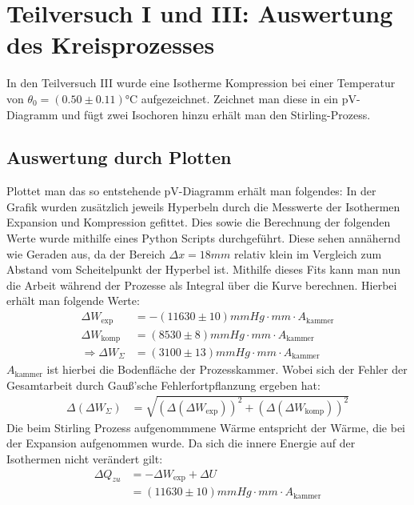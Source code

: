 \documentclass{report}
\begin{document}
\newpage
\section{Teilversuch I und III: Auswertung des Kreisprozesses}
In den Teilversuch III wurde eine Isotherme Kompression bei einer Temperatur von $\theta_0 = (0.50 \pm 0.11) \si{\degreeCelsius}$ aufgezeichnet. Zeichnet man diese in ein
pV-Diagramm und fügt zwei Isochoren hinzu erhält man den Stirling-Prozess.
\subsection{Auswertung durch Plotten}
Plottet man das so entstehende pV-Diagramm erhält man folgendes:
In der Grafik wurden zusätzlich jeweils Hyperbeln durch die Messwerte der Isothermen Expansion und Kompression gefittet. Dies sowie die Berechnung der folgenden Werte
wurde mithilfe eines Python Scripts durchgeführt.
Diese sehen annähernd wie Geraden aus, da der Bereich $\Delta x = 18 \si{mm}$ relativ klein im Vergleich zum Abstand vom Scheitelpunkt der Hyperbel ist.
Mithilfe dieses Fits kann man nun die Arbeit während der Prozesse als Integral über die Kurve berechnen. Hierbei erhält man folgende Werte:
\begin{equation}
    \begin{split}
        \Delta W_{\mathrm{exp}} &= -(11630 \pm 10) \si{mmHg} \cdot \si{mm} \cdot A_{\mathrm{kammer}}\\
        \Delta W_{\mathrm{komp}} &= (8530 \pm 8) \si{mmHg} \cdot \si{mm} \cdot A_{\mathrm{kammer}}\\
        \Rightarrow \Delta W_{\Sigma} &= (3100 \pm 13) \si{mmHg} \cdot \si{mm} \cdot A_{\mathrm{kammer}}
    \end{split}
\end{equation}
$A_{\mathrm{kammer}}$ ist hierbei die Bodenfläche der Prozesskammer.
Wobei sich der Fehler der Gesamtarbeit durch Gauß'sche Fehlerfortpflanzung ergeben hat:
\begin{equation}
    \begin{split}
        \Delta (\Delta W_{\Sigma}) &= \sqrt{\left(\Delta (\Delta W_{\mathrm{exp}})\right)^2 + \left(\Delta (\Delta W_{\mathrm{komp}})\right)^2}
    \end{split}
\end{equation}
Die beim Stirling Prozess aufgenommmene Wärme entspricht der Wärme, die bei der Expansion aufgenommen wurde.
Da sich die innere Energie auf der Isothermen nicht verändert gilt:
\begin{equation}
    \begin{split}
        \Delta Q_{zu} &= - \Delta W_{\mathrm{exp}} + \Delta U \\
                    &= (11630 \pm 10) \si{mmHg} \cdot \si{mm} \cdot A_{\mathrm{kammer}}
    \end{split}
\end{equation}
\end{document}
